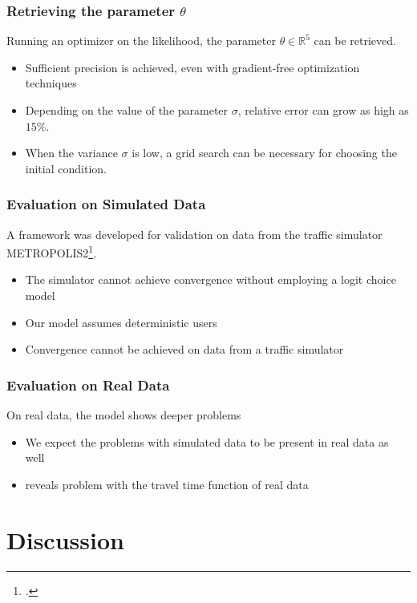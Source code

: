 \documentclass[hyperref={pdfpagelabels=false}]{beamer}
\begin{document}
\begin{frame}
  \frametitle{Retrieving the parameter \(\theta\)}
  Running an optimizer on the likelihood,
  the parameter \(\theta \in \mathbb{R}^5\) can be retrieved.
  \begin{itemize}
  \item<2-> Sufficient precision is achieved, even with gradient-free optimization techniques
  \item<3-> Depending on the value of the parameter \(\sigma\),
    relative error can grow as high as \(15\%\).
  \item<4-> When the variance \(\sigma\) is low, a grid search can be necessary for choosing the initial condition.
  \end{itemize}
\end{frame}

\begin{frame}
  \frametitle{Evaluation on Simulated Data}
  A framework was developed for validation on data from the traffic simulator METROPOLIS2\footcite{RePEc:ema:worpap:2024-03}.
  \begin{itemize}
  \item<2-> The simulator cannot achieve convergence without employing a logit choice model
  \item<2-> Our model assumes deterministic users
  \item<3-> Convergence cannot be achieved on data from a traffic simulator
  \end{itemize}
\end{frame}

\begin{frame}
  \frametitle{Evaluation on Real Data}
  On real data, the model shows deeper problems
  \begin{itemize}
  \item<1-> We expect the problems with simulated data to be present in real data as well
  \item<2-> \textcite{https://doi.org/10.1111/iere.12692} reveals problem with the travel time function of real data
  \end{itemize}
\end{frame}

\section{Discussion}

\begin{frame}
  \tableofcontents[currentsection]
\end{frame}
\end{document}

